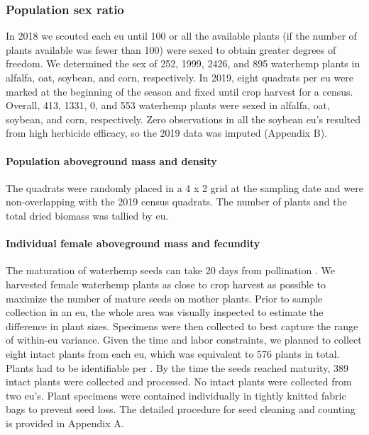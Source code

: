 \documentclass[utf8]{frontiersSCNS}
\begin{document}
\hypertarget{population-sex-ratio}{%
\subsubsection*{Population sex ratio}\label{population-sex-ratio}}

In 2018 we scouted each eu until 100 or all the available plants (if the number of plants available was fewer than 100) were sexed to obtain greater degrees of freedom. We determined the sex of 252, 1999, 2426, and 895 waterhemp plants in alfalfa, oat, soybean, and corn, respectively. In 2019, eight quadrats per eu were marked at the beginning of the season and fixed until crop harvest for a census. Overall, 413, 1331, 0, and 553 waterhemp plants were sexed in alfalfa, oat, soybean, and corn, respectively. Zero observations in all the soybean eu's resulted from high herbicide efficacy, so the 2019 data was imputed (Appendix B).

\hypertarget{population-aboveground-mass-and-density}{%
\paragraph*{Population aboveground mass and density}\label{population-aboveground-mass-and-density}}

The quadrats were randomly placed in a 4 x 2 grid at the sampling date and were non-overlapping with the 2019 census quadrats. The number of plants and the total dried biomass was tallied by eu.

\hypertarget{individual-female-aboveground-mass-and-fecundity}{%
\paragraph*{Individual female aboveground mass and fecundity}\label{individual-female-aboveground-mass-and-fecundity}}

The maturation of waterhemp seeds can take 20 days from pollination \citep{bellTimeRequirementPollination2010}.
We harvested female waterhemp plants as close to crop harvest as possible to maximize the number of mature seeds on mother plants. Prior to sample collection in an eu, the whole area was visually inspected to estimate the difference in plant sizes. Specimens were then collected to best capture the range of within-eu variance.
Given the time and labor constraints, we planned to collect eight intact plants from each eu, which was equivalent to 576 plants in total. Plants had to be identifiable per \citet{uvaWeedsNortheast1997}. By the time the seeds reached maturity, 389 intact plants were collected and processed. No intact plants were collected from two eu's.
Plant specimens were contained individually in tightly knitted fabric bags to prevent seed loss. The detailed procedure for seed cleaning and counting is provided in Appendix A.
\end{document}
